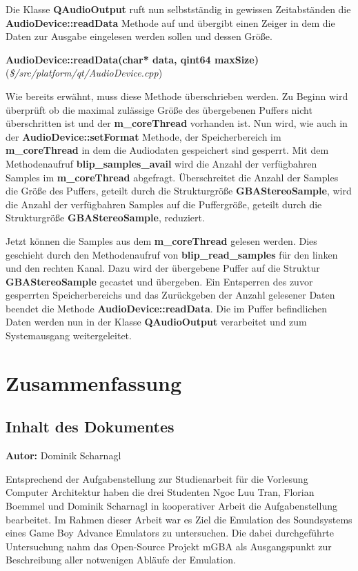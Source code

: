 \documentclass[11pt,a4paper]{scrartcl}
\newcommand{\AutorDominik} {
    \vspace{-4mm}
    \large \textbf{Autor:} Dominik Scharnagl \normalsize
    \vspace{2mm}
}
\newcommand{\paratitlecode}[2] {
    \vspace{5mm}
    \large \textbf{#1} \normalsize(\textit{\${#2}})
    \vspace{2mm}\newline
}
\begin{document}
Die Klasse \textbf{QAudioOutput} ruft nun selbstst\"andig  in gewissen Zeitabst\"anden die \textbf{AudioDevice::readData} Methode auf und \"ubergibt einen Zeiger in dem die Daten zur Ausgabe eingelesen werden sollen und dessen Gr\"o{\ss}e.


\paratitlecode{AudioDevice::readData(char* data, qint64 maxSize)}{/src/platform/qt/AudioDevice.cpp}
Wie bereits erw\"ahnt, muss diese Methode \"uberschrieben werden. Zu Beginn wird \"uberpr\"uft ob die maximal zul\"assige Gr\"o{\ss}e des \"ubergebenen Puffers nicht \"uberschritten ist und der \textbf{m\_coreThread} vorhanden ist.
Nun wird, wie auch in der \textbf{AudioDevice::setFormat} Methode, der Speicherbereich im \textbf{m\_coreThread} in dem die Audiodaten gespeichert sind gesperrt.
Mit dem Methodenaufruf \textbf{blip\_samples\_avail} wird die Anzahl der verf\"ugbahren Samples im \textbf{m\_coreThread} abgefragt. \"Uberschreitet die Anzahl der Samples die Gr\"o{\ss}e des Puffers, geteilt durch die 
Strukturgr\"o{\ss}e \textbf{GBAStereoSample}, wird die Anzahl der verf\"ugbahren Samples auf die Puffergr\"o{\ss}e, geteilt durch die Strukturgr\"o{\ss}e \textbf{GBAStereoSample}, reduziert.

Jetzt k\"onnen die Samples aus dem \textbf{m\_coreThread} gelesen werden. Dies geschieht durch den Methodenaufruf von \textbf{blip\_read\_samples} f\"ur den linken und den rechten Kanal. 
Dazu wird der \"ubergebene Puffer auf die Struktur \textbf{GBAStereoSample} gecastet und \"ubergeben. Ein Entsperren des zuvor gesperrten Speicherbereichs und das Zur\"uckgeben der Anzahl gelesener Daten beendet die Methode
\textbf{AudioDevice::readData}. Die im Puffer befindlichen Daten werden nun in der Klasse \textbf{QAudioOutput} verarbeitet und zum Systemausgang weitergeleitet.



\newpage
\section{Zusammenfassung} \label{Zusammenfassung}


\subsection{Inhalt des Dokumentes}
\AutorDominik

Entsprechend der Aufgabenstellung zur Studienarbeit f\"ur die Vorlesung Computer Architektur haben die drei Studenten Ngoc Luu Tran, Florian Boemmel und Dominik Scharnagl in kooperativer Arbeit die Aufgabenstellung bearbeitet. Im Rahmen dieser Arbeit war es Ziel die Emulation des Soundsystems eines Game Boy Advance Emulators zu untersuchen. Die dabei durchgef\"uhrte Untersuchung nahm das Open-Source Projekt mGBA als Ausgangspunkt zur Beschreibung aller notwenigen Abl\"aufe der Emulation.
\end{document}
